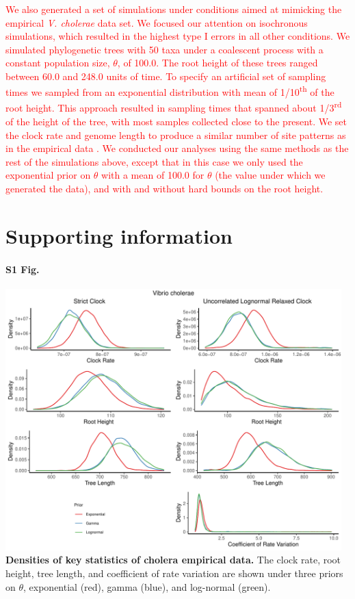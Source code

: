 \documentclass[10pt,letterpaper]{article}
\begin{document}
\textcolor{red}{We also generated a set of simulations under conditions aimed at mimicking the empirical \textit{V. cholerae} data set. We focused our attention on isochronous simulations, which resulted in the highest type I errors in all other conditions. We simulated phylogenetic trees with 50 taxa under a coalescent process with a constant population size, $\theta$, of 100.0. The root height of these trees ranged between 60.0 and 248.0 units of time. To specify an artificial set of sampling times we sampled from an exponential distribution with mean of 1/10\textsuperscript{th} of the root height. This approach resulted in sampling times that spanned about 1/3\textsuperscript{rd} of the height of the tree, with most samples collected close to the present. We set the clock rate and genome length to produce a similar number of site patterns as in the empirical data \cite{devault2014second}. We conducted our analyses using the same methods as the rest of the simulations above, except that in this case we only used the exponential prior on $\theta$ with a mean of 100.0 for $\theta$ (the value under which we generated the data), and with and without hard bounds on the root height.}

\section*{Supporting information}

\paragraph*{S1 Fig.}
\label{S1_Fig}
	\begin{center}
		\includegraphics[width=13cm]{sandbox_figures/cholera_density_plot.pdf}\newline
		\textbf{Densities of key statistics of cholera empirical data.} The clock rate, root height, tree length, and coefficient of rate variation are shown under three priors on $\theta$, exponential (red), gamma (blue), and log-normal (green).
	\end{center}
\end{document}
